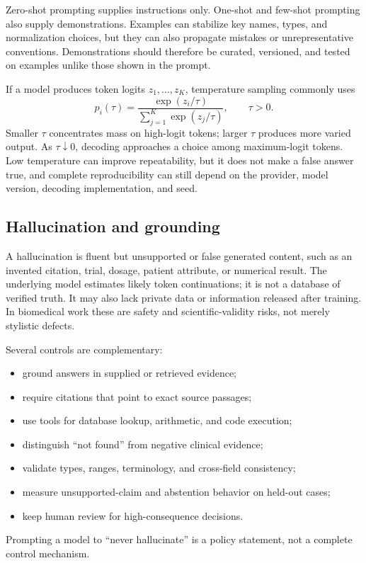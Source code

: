 \documentclass[12pt,oneside]{book}
\numberwithin{equation}{section}
\theoremstyle{definition}
\theoremstyle{plain}
\theoremstyle{remark}
\begin{document}
Zero-shot prompting supplies instructions only.  One-shot and few-shot prompting
also supply demonstrations.  Examples can stabilize key names, types, and
normalization choices, but they can also propagate mistakes or unrepresentative
conventions.  Demonstrations should therefore be curated, versioned, and tested
on examples unlike those shown in the prompt.

If a model produces token logits $z_1,\ldots,z_K$, temperature sampling commonly
uses
\[
 p_i(\tau)=\frac{\exp(z_i/\tau)}{\sum_{j=1}^K\exp(z_j/\tau)},
 \qquad \tau>0.
\]
Smaller $\tau$ concentrates mass on high-logit tokens; larger $\tau$ produces
more varied output.  As $\tau\downarrow0$, decoding approaches a choice among
maximum-logit tokens.  Low temperature can improve repeatability, but it does
not make a false answer true, and complete reproducibility can still depend on
the provider, model version, decoding implementation, and seed.

\subsection{Hallucination and grounding}

A hallucination is fluent but unsupported or false generated content, such as
an invented citation, trial, dosage, patient attribute, or numerical result.
The underlying model estimates likely token continuations; it is not a database
of verified truth.  It may also lack private data or information released after
training.  In biomedical work these are safety and scientific-validity risks,
not merely stylistic defects.

Several controls are complementary:
\begin{itemize}
    \item ground answers in supplied or retrieved evidence;
    \item require citations that point to exact source passages;
    \item use tools for database lookup, arithmetic, and code execution;
    \item distinguish ``not found'' from negative clinical evidence;
    \item validate types, ranges, terminology, and cross-field consistency;
    \item measure unsupported-claim and abstention behavior on held-out cases;
    \item keep human review for high-consequence decisions.
\end{itemize}
Prompting a model to ``never hallucinate'' is a policy statement, not a complete
control mechanism.
\end{document}
